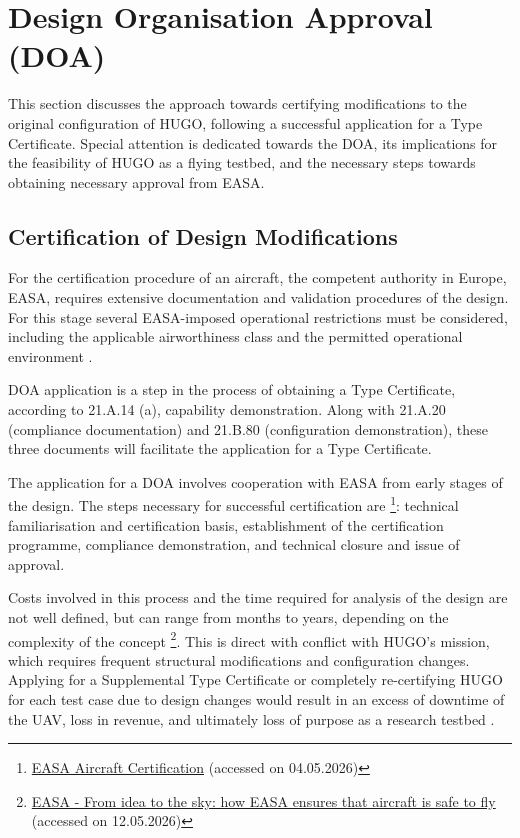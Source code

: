 \section{Design Organisation Approval (DOA)} \label{sec: DOA}
This section discusses the approach towards certifying modifications to the original configuration of HUGO, following a successful application for a Type Certificate. Special attention is dedicated towards the DOA, its implications for the feasibility of HUGO as a flying testbed, and the necessary steps towards obtaining necessary approval from EASA.

\subsection{Certification of Design Modifications}
For the certification procedure of an aircraft, the competent authority in Europe, EASA, requires extensive documentation and validation procedures of the design. For this stage several EASA-imposed operational restrictions must be considered, including the applicable airworthiness class and the permitted operational environment \cite{EASAInitialAirworthiness2025}.

DOA application is a step in the process of obtaining a Type Certificate, according to 21.A.14 (a), capability demonstration. Along with 21.A.20 (compliance documentation) and 21.B.80 (configuration demonstration), these three documents will facilitate the application for a Type Certificate.

The application for a DOA involves cooperation with EASA from early stages of the design. The steps necessary for successful certification are \footnote{\href{https://www.easa.europa.eu/en/domains/aircraft-products/aircraft-certification?}{EASA Aircraft Certification} (accessed on 04.05.2026)}: technical familiarisation and certification basis, establishment of the certification programme, compliance demonstration, and technical closure and issue of approval.

Costs involved in this process and the time required for analysis of the design are not well defined, but can range from months to years, depending on the complexity of the concept \footnote{\href{https://www.easa.europa.eu/en/light/topics/idea-sky-how-easa-ensures-aircraft-safe-fly}{EASA - From idea to the sky: how EASA ensures that aircraft is safe to fly} (accessed on 12.05.2026)}. This is direct with conflict with HUGO's mission, which requires frequent structural modifications and configuration changes. Applying for a Supplemental Type Certificate or completely re-certifying HUGO for each test case due to design changes would result in an excess of downtime of the UAV, loss in revenue, and ultimately loss of purpose as a research testbed \cite{EU2019_2153_fees-and-charges}.

